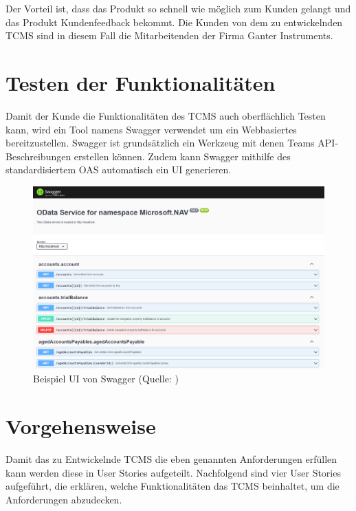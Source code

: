 \documentclass[a4paper, fontsize=11pt, parskip=half, twoside]{scrreprt}
\begin{document}
	Der Vorteil ist, dass das Produkt so schnell wie möglich zum Kunden gelangt und das Produkt Kundenfeedback bekommt.
	Die Kunden von dem zu entwickelnden \ac{TCMS} sind in diesem Fall die Mitarbeitenden der Firma Ganter Instruments.
	
	\textcite{alliance_what_2017}
	
	
	\section{Testen der Funktionalitäten}
	Damit der Kunde die Funktionalitäten des \ac{TCMS} auch oberflächlich Testen kann, wird ein Tool namens Swagger verwendet um ein Webbasiertes  bereitzustellen.
	Swagger ist grundsätzlich ein Werkzeug mit denen Teams \ac{API}-Beschreibungen erstellen können.
	Zudem kann Swagger mithilfe des standardisiertem \ac{OAS} automatisch ein \ac{UI} generieren.
	
	\textcite{noauthor_api_nodate}
	
	\begin{figure}[ht]
		\centering
		\includegraphics[scale=0.6]{assets/swaggerui.png}
		\caption{Beispiel \ac{UI} von Swagger (Quelle: \textcite{noauthor_host_nodate})}
	\end{figure}

	\section{Vorgehensweise}
	Damit das zu Entwickelnde \ac{TCMS} die eben genannten Anforderungen erfüllen kann werden diese in User Stories aufgeteilt.
	Nachfolgend sind vier User Stories aufgeführt, die erklären, welche Funktionalitäten das \ac{TCMS} beinhaltet, um die Anforderungen abzudecken.
	
\end{document}
